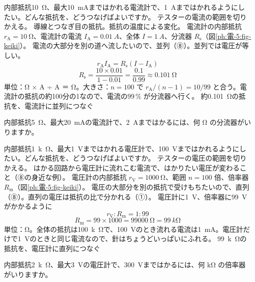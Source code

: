 \begin{phreidai}[電流計の分流器]
\label{ph:電-5:ex11}内部抵抗\qty{10}{\ohm}、最大\qty{10}{mA}まではかれる電流計で、\qty{1}{A}まではかれるようにしたい。どんな抵抗を、どうつなげばよいですか。
\phbamen
テスターの電流の範囲を切りかえる。
\phmushi
導線とつなぎ目の抵抗。抵抗の温度による変化。
\phzu
電流計の内部抵抗 $r_{\mathrm A}=\qty{10}{\ohm}$、電流計の電流 $I_{\mathrm A}=\qty{0.01}{A}$、全体 $I=\qty{1}{A}$、分流器 $R_{\mathrm s}$（図\ref{ph:電-5:fig-keiki}）。
\phriyu
電流の大部分を別の道へ流したいので、並列（⑧）。並列では電圧が等しい。
\phtateru
\[ r_{\mathrm A}I_{\mathrm A}=R_{\mathrm s}(I-I_{\mathrm A}) \]
\phtoku
\[ R_{\mathrm s}=\frac{10\times0.01}{1-0.01}=\frac{0.1}{0.99}\approx\qty{0.101}{\ohm} \]
\phtashikame
単位：Ω × A ÷ A ＝ Ω。大きさ：$n=100$ で $r_{\mathrm A}/(n-1)=10/99$ と合う。電流計の抵抗の約100分の1なので、電流の99\,\% が分流器へ行く。
\kotae 約\qty{0.101}{\ohm}の抵抗を、電流計に並列につなぐ
\end{phreidai}
\begin{jibun}
内部抵抗\qty{5}{\ohm}、最大\qty{20}{mA}の電流計で、\qty{2}{A}まではかるには、何 Ω の分流器がいりますか。
\end{jibun}

\begin{phreidai}[電圧計の倍率器]
\label{ph:電-5:ex12}内部抵抗\qty{1}{k\ohm}、最大\qty{1}{V}まではかれる電圧計で、\qty{100}{V}まではかれるようにしたい。どんな抵抗を、どうつなげばよいですか。
\phbamen
テスターの電圧の範囲を切りかえる。
\phmushi
はかる回路から電圧計に流れこむ電流で、はかりたい電圧が変わること（⑧の身近な例）。
\phzu
電圧計の内部抵抗 $r_{\mathrm V}=\qty{1000}{\ohm}$、範囲 $n=100$ 倍、倍率器 $R_{\mathrm m}$（図\ref{ph:電-5:fig-keiki}）。
\phriyu
電圧の大部分を別の抵抗で受けもちたいので、直列（⑧）。直列の電圧は抵抗の比で分かれる（①）。
\phtateru
電圧計に\qty{1}{V}、倍率器に\qty{99}{V}がかかるように
\[ r_{\mathrm V}:R_{\mathrm m}=1:99 \]
\phtoku
\[ R_{\mathrm m}=99\times1000=\qty{99000}{\ohm}=\qty{99}{k\ohm} \]
\phtashikame
単位：Ω。全体の抵抗は\qty{100}{k\ohm}で、\qty{100}{V}のとき流れる電流は\qty{1}{mA}。電圧計だけで\qty{1}{V}のときと同じ電流なので、針はちょうどいっぱいにふれる。
\kotae \qty{99}{k\ohm}の抵抗を、電圧計に直列につなぐ
\end{phreidai}
\begin{jibun}
内部抵抗\qty{2}{k\ohm}、最大\qty{3}{V}の電圧計で、\qty{300}{V}まではかるには、何 kΩ の倍率器がいりますか。
\end{jibun}

